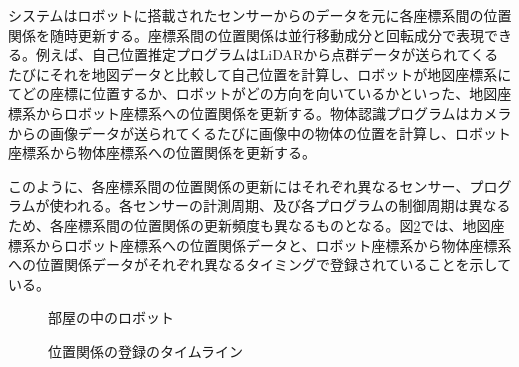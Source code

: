 \documentclass[a4paper]{jreport}	%
\begin{document}
システムはロボットに搭載されたセンサーからのデータを元に各座標系間の位置関係を随時更新する。座標系間の位置関係は並行移動成分と回転成分で表現できる。例えば、自己位置推定プログラムはLiDARから点群データが送られてくるたびにそれを地図データと比較して自己位置を計算し、ロボットが地図座標系にてどの座標に位置するか、ロボットがどの方向を向いているかといった、地図座標系からロボット座標系への位置関係を更新する。物体認識プログラムはカメラからの画像データが送られてくるたびに画像中の物体の位置を計算し、ロボット座標系から物体座標系への位置関係を更新する。

このように、各座標系間の位置関係の更新にはそれぞれ異なるセンサー、プログラムが使われる。各センサーの計測周期、及び各プログラムの制御周期は異なるため、各座標系間の位置関係の更新頻度も異なるものとなる。図\ref{fig:sensor-sync}では、地図座標系からロボット座標系への位置関係データと、ロボット座標系から物体座標系への位置関係データがそれぞれ異なるタイミングで登録されていることを示している。



\begin{figure}[h] 
\caption{部屋の中のロボット}
\label{fig:room}
\end{figure}

\begin{figure}[h] 
\caption{位置関係の登録のタイムライン}
\label{fig:sensor-sync}
\end{figure}
\end{document}
